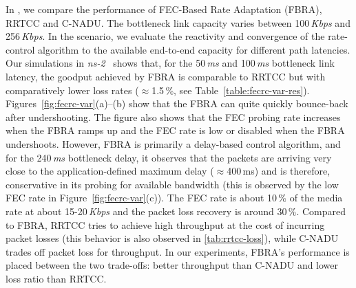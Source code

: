 In , we compare the performance of FEC-Based Rate Adaptation
(FBRA), RRTCC and C-NADU. The bottleneck link capacity varies between
100\,\emph{Kbps} and 256\,\emph{Kbps}. In the scenario, we evaluate the
reactivity and convergence of the rate-control algorithm to the available 
end-to-end capacity for different path latencies. Our simulations in
\emph{ns-2}~\cite{ns2} shows that, for the 50\,\emph{ms} and 100\,\emph{ms}
bottleneck link latency, the goodput achieved by FBRA is comparable to RRTCC
but with comparatively lower loss rates ($\approx$1.5\,\%, see
Table~\ref{table:fecrc-var-res}). Figures~\ref{fig:fecrc-var}(a)--(b) show
that the FBRA can quite quickly bounce-back after undershooting. The figure
also shows that the FEC probing rate increases when the FBRA ramps up and the
FEC rate is low or disabled when the FBRA undershoots. However, FBRA is
primarily a delay-based control algorithm, and for the 240\,\emph{ms} bottleneck
delay, it observes that the packets are arriving very close to the 
application-defined maximum delay ($\approx$400\,ms) and is therefore, conservative in its
probing for available bandwidth (this is observed by the low FEC rate in
Figure~\ref{fig:fecrc-var}(c)). The FEC rate is about 10\,\% of the media rate at
about 15-20\,\emph{Kbps} and the packet loss recovery is around 30\,\%.
Compared to FBRA, RRTCC tries to achieve high throughput at the cost of
incurring packet losses (this behavior is also observed in \ref{tab:rrtcc-loss}), 
while C-NADU trades off packet loss for throughput. In our
experiments, FBRA's performance is placed between the two trade-offs: better
throughput than C-NADU and lower loss ratio than RRTCC.


